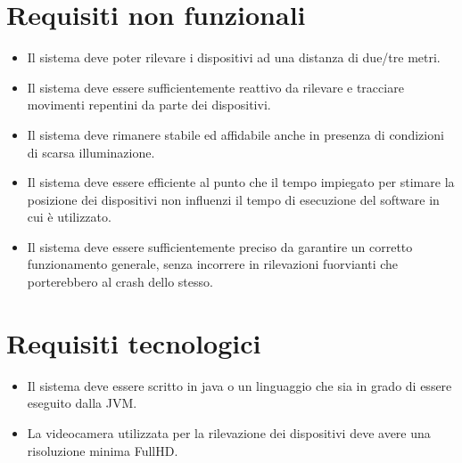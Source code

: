 \documentclass[12pt,a4paper,openright,twoside]{book}
\begin{document}
\section{Requisiti non funzionali} \label{sec:requisiti_non_funzionali}
\begin{itemize}
	\item Il sistema deve poter rilevare i dispositivi ad una distanza di due/tre metri.
	\item Il sistema deve essere sufficientemente reattivo da rilevare e tracciare movimenti repentini da parte dei dispositivi.
	\item Il sistema deve rimanere stabile ed affidabile anche in presenza di condizioni di scarsa illuminazione.
	\item Il sistema deve essere efficiente al punto che il tempo impiegato per stimare la posizione dei dispositivi non influenzi il tempo di esecuzione del software in cui è utilizzato.
	\item Il sistema deve essere sufficientemente preciso da garantire un corretto funzionamento generale, senza incorrere in rilevazioni fuorvianti che porterebbero al crash dello stesso.
\end{itemize}
\section{Requisiti tecnologici}
\begin{itemize}
	\item Il sistema deve essere scritto in java o un linguaggio che sia in grado di essere eseguito dalla JVM.
	\item La videocamera utilizzata per la rilevazione dei dispositivi deve avere una risoluzione minima \gls{FullHD}.
\end{itemize}
\end{document}
